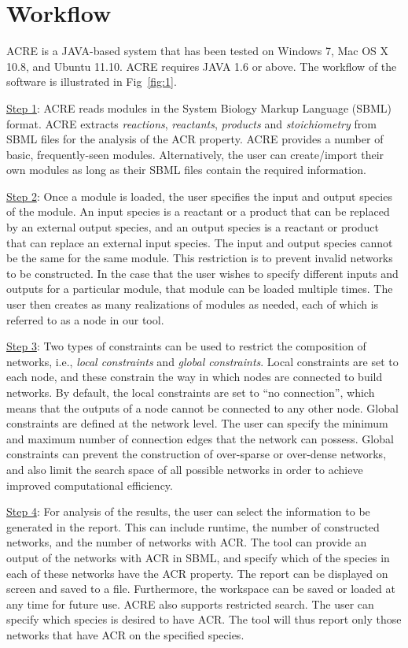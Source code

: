 \documentclass{report}
\begin{document}
\section{Workflow}
ACRE is a JAVA-based system that has been tested on Windows 7, Mac OS X 10.8, and Ubuntu
11.10. ACRE requires JAVA 1.6 or above. The workflow of the software is illustrated in Fig~\ref{fig:1}.


\underline{Step 1}: ACRE reads modules in the System Biology Markup Language (SBML) format. ACRE
extracts \textit{reactions}, \textit{reactants}, \textit{products} and \textit{stoichiometry} from SBML files for the analysis of the
ACR property. ACRE provides a number of basic, frequently-seen modules. Alternatively, the
user can create/import their own modules as long as their SBML files contain the required
information.


\underline{Step 2}: Once a module is loaded, the user specifies the input and output species of the module.
An input species is a reactant or a product that can be replaced by an external output species,
and an output species is a reactant or product that can replace an external input species. The
input and output species cannot be the same for the same module. This restriction is to prevent
invalid networks to be constructed. In the case that the user wishes to specify different inputs
and outputs for a particular module, that module can be loaded multiple times. The user then
creates as many realizations of modules as needed, each of which is referred to as a node in our
tool.


\underline{Step 3}: Two types of constraints can be used to restrict the composition of networks, i.e., \textit{local
constraints} and \textit{global constraints}. Local constraints are set to each node, and these constrain
the way in which nodes are connected to build networks. By default, the local constraints are set
to ``no connection'', which means that the outputs of a node cannot be connected to any other
node. Global constraints are defined at the network level. The user can specify the minimum
and maximum number of connection edges that the network can possess. Global constraints
can prevent the construction of over-sparse or over-dense networks, and also limit the search
space of all possible networks in order to achieve improved computational efficiency.


\underline{Step 4}: For analysis of the results, the user can select the information to be generated in the
report. This can include runtime, the number of constructed networks, and the number of
networks with ACR. The tool can provide an output of the networks with ACR in SBML, and
specify which of the species in each of these networks have the ACR property. The report can be
displayed on screen and saved to a file. Furthermore, the workspace can be saved or loaded at
any time for future use. ACRE also supports restricted search. The user can specify which species
is desired to have ACR. The tool will thus report only those networks that have ACR on the
specified species.
\end{document}
